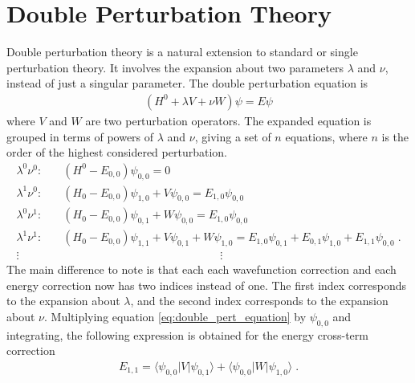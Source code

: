     \section{Double Perturbation Theory} \label{sec:Double_Perturbation_Theory}
        Double perturbation theory is a natural extension to standard or single perturbation theory. It involves the expansion about two parameters $\lambda$ and $\nu$, instead of just a singular parameter. The double perturbation equation is
        \begin{align}
            \left( H^0 + \lambda V + \nu W \right) \psi = E\psi
        \end{align}
        \noindent where $V$ and $W$ are two perturbation operators. The expanded equation is grouped in terms of powers of $\lambda$ and $\nu$, giving a set of $n$ equations, where $n$ is the order of the highest considered perturbation. 
        \begin{align}
            \lambda^0 \nu^0: &\hspace{1em} \left(H^0 - E_{0,0} \right) \psi_{0,0} = 0 \\
            \lambda^1 \nu^0: &\hspace{1em} \left(H_0 - E_{0,0} \right) \psi_{1,0} + V\psi_{0,0} = E_{1, 0} \psi_{0,0} \\
            \lambda^0 \nu^1: &\hspace{1em} \left(H_0 - E_{0,0} \right) \psi_{0,1} + W \psi_{0,0} = E_{1,0} \psi_{0,0}\\
            \lambda^1 \nu^1: &\hspace{1em} \left(H_0 - E_{0,0} \right) \psi_{1, 1} + V \psi_{0,1} + W \psi_{1, 0} = E_{1,0} \psi_{0,1} + E_{0,1} \psi_{1,0} + E_{1,1} \psi_{0,0} \;.\label{eq:double_pert_equation}\\
            \vdots &\hspace{15em} \vdots\nonumber 
        \end{align}
        The main difference to note is that each each wavefunction correction and each energy correction now has two indices instead of one. The first index corresponds to the expansion about $\lambda$, and the second index corresponds to the expansion about $\nu$. Multiplying equation \eqref{eq:double_pert_equation} by $\psi_{0,0}$ and integrating, the following expression is obtained for the energy cross-term correction
        \begin{align}
            E_{1,1} = \langle \psi_{0,0} \vert V \vert \psi_{0,1} \rangle + \langle \psi_{0,0} \vert W \vert \psi_{1,0} \rangle \label{eq:E11}\;.
        \end{align}
